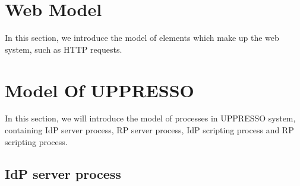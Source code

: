 \begin{appendices}
\section{Web Model}
In this section, we introduce the model of elements which make up the web system, such as HTTP requests.

\section{Model Of UPPRESSO}
In this section, we will introduce the model of processes in UPPRESSO system, containing IdP server process, RP server process, IdP scripting process and RP scripting process.
\subsection{IdP server process}

\end{appendices}
